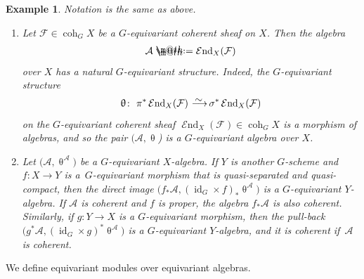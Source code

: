 \documentclass[pdftex]{sigma}%
\makeatletter
\newtheorem{exa}[dfn]{Example}
\newcommand*{\defeq}{\mathrel{\rlap{%
 \raisebox{0.3ex}{$\m@th\cdot$}}%
 \raisebox{-0.3ex}{$\m@th\cdot$}}%
 =}
\numberwithin{equation}{section}
\newcommand{\cEnd}{\operatorname{{\mathcal E}nd}}
\newcommand{\coh}{\operatorname{coh}}
\newcommand{\id}{\operatorname{id}}
\newcommand{\cA}{\mathcal{A}}
\newcommand{\cF}{\mathcal{F}}
\newcommand{\simto}{\,\,\,\,\raisebox{4pt}{$\sim$}{\kern -1.1em \longrightarrow}\,}
\makeatother
\begin{document}
\begin{exa}\label{end ex}
Notation is the same as above.
\begin{enumerate}\itemsep=0pt
\item Let $\cF\in \coh_GX$ be a $G$-equivariant coherent sheaf on $X$. Then the algebra
\begin{gather*}
\cA\defeq\cEnd_X(\cF)
\end{gather*}
over $X$ has a natural $G$-equivariant structure. Indeed, the $G$-equivariant structure
\begin{gather*}
\uptheta\colon\ \pi^*\cEnd_X(\cF)\simto \sigma^*\cEnd_X(\cF)
\end{gather*}
on the $G$-equivariant coherent sheaf $\cEnd_X(\cF)\in\coh_GX$
is a morphism of algebras, and so the pair $(\cA, \uptheta$) is a $G$-equivariant algebra over $X$.


\item Let $\big(\cA,\uptheta^{\cA}\big)$ be a $G$-equivariant $X$-algebra. If $Y$ is another $G$-scheme and $f\colon X\to Y$ is a~$G$-equ\-i\-variant morphism that is quasi-separated and quasi-compact,
then the direct image
$\big(f_*\cA,(\id_G\times f)_*\uptheta^{\cA}\big)$
is a $G$-equivariant $Y$-algebra. If $\cA$ is coherent and $f$ is proper, the algebra $f_*\cA$ is also coherent. Similarly, if $g\colon Y\to X$ is a $G$-equivariant morphism, then the pull-back $\big(g^*\cA,(\id_G\times g)^*\uptheta^{\cA}\big)$ is a $G$-equivariant $Y$-algebra, and it is coherent if~$\cA$ is coherent.
 \end{enumerate}
\end{exa}



We define equivariant modules over equivariant algebras.
\end{document}
